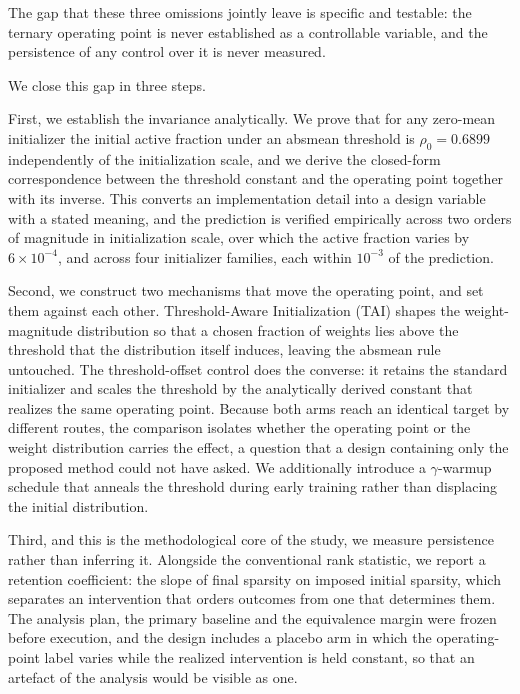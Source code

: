 \documentclass[final,5p,times,twocolumn]{elsarticle}
\theoremstyle{remark}
\newcommand{\rhoz}{\rho_{0}}
\begin{document}
The gap that these three omissions jointly leave is specific and testable:
the ternary operating point is never established as a controllable
variable, and the persistence of any control over it is never measured.

We close this gap in three steps.

First, we establish the invariance analytically. We prove that for any
zero-mean initializer the initial active fraction under an absmean threshold
is $\rhoz = 0.6899$ independently of the initialization scale, and we derive
the closed-form correspondence between the threshold constant and the
operating point together with its inverse. This converts an implementation
detail into a design variable with a stated meaning, and the prediction is
verified empirically across two orders of magnitude in initialization scale,
over which the active fraction varies by $6 \times 10^{-4}$, and across four
initializer families, each within $10^{-3}$ of the prediction.

Second, we construct two mechanisms that move the operating point, and set
them against each other. Threshold-Aware Initialization (TAI) shapes the
weight-magnitude distribution so that a chosen fraction of weights lies above
the threshold that the distribution itself induces, leaving the absmean rule
untouched. The
threshold-offset control does the converse: it retains the standard
initializer and scales the threshold by the analytically derived constant that
realizes the same operating point. Because both arms reach an identical target
by different routes, the comparison isolates whether the operating point or the
weight distribution carries the effect, a question that a design containing
only the proposed method could not have asked. We additionally introduce a
$\gamma$-warmup schedule that anneals the threshold during early training
rather than displacing the initial distribution.

Third, and this is the methodological core of the study, we measure
persistence rather than inferring it. Alongside the conventional rank
statistic, we report a retention coefficient: the slope of final
sparsity on imposed initial sparsity, which separates an intervention that
orders outcomes from one that determines them. The analysis plan, the primary
baseline and the equivalence margin were frozen before execution, and the
design includes a placebo arm in which the operating-point label varies while
the realized intervention is held constant, so that an artefact of the analysis
would be visible as one.
\end{document}
